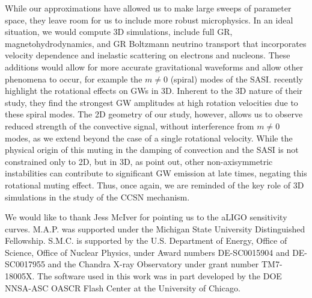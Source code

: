 \documentclass[twocolumn,times]{aastex62}  %
\begin{document}

While our approximations have allowed us to make large sweeps of parameter space, they leave room for us to include more robust microphysics.  In an ideal situation, we would compute 3D simulations, include full GR, magnetohydrodynamics, and GR Boltzmann neutrino transport that incorporates velocity dependence and inelastic scattering on electrons and nucleons.  These additions would allow for more accurate gravitational waveforms and allow other phenomena to occur, for example the $m\ne 0$ (spiral) modes of the SASI. \citet{andresen:2018} recently highlight the rotational effects on GWs in 3D.  Inherent to the 3D nature of their study, they find the strongest GW amplitudes at high rotation velocities due to these spiral modes.  The 2D geometry of our study, however, allows us to observe reduced strength of the convective signal, without interference from $m\ne 0$ modes, as we extend beyond the case of a single rotational velocity.
While the physical origin of this muting in the damping of convection and the SASI is not constrained only to 2D, but in 3D, as \citet{andresen:2018} point out, other non-axisymmetric instabilities can contribute to significant GW emission at late times, negating this rotational muting effect.
Thus, once again, we are reminded of the key role of 3D simulations in the study of the CCSN mechanism.

\acknowledgements

We would like to thank Jess McIver for pointing us to the aLIGO sensitivity curves.  M.A.P. was supported under the Michigan State University Distinguished Fellowship. 
S.M.C. is supported by the U.S. Department of Energy, Office of Science, Office of Nuclear Physics,
under Award numbers DE-SC0015904 and DE-SC0017955 and the Chandra
X-ray Observatory under grant number TM7-18005X.
The software used in this
work was in part developed by the DOE NNSA-ASC OASCR Flash Center at
the University of Chicago.  

    





\end{document}
